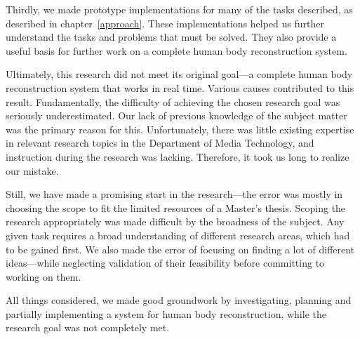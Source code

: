 Thirdly, we made prototype implementations for many of the tasks described, as described in chapter~\ref{approach}. These implementations helped us further understand the tasks and problems that must be solved. They also provide a useful basis for further work on a complete human body reconstruction system.

\newtopic

Ultimately, this research did not meet its original goal---a complete human body reconstruction system that works in real time. Various causes contributed to this result. Fundamentally, the difficulty of achieving the chosen research goal was seriously underestimated. Our lack of previous knowledge of the subject matter was the primary reason for this. Unfortunately, there was little existing expertise in relevant research topics in the Department of Media Technology, and instruction during the research was lacking. Therefore, it took us long to realize our mistake.

Still, we have made a promising start in the research---the error was mostly in choosing the scope to fit the limited resources of a Master's thesis. Scoping the research appropriately was made difficult by the broadness of the subject. Any given task requires a broad understanding of different research areas, which had to be gained first. We also made the error of focusing on finding a lot of different ideas---while neglecting validation of their feasibility before committing to working on them.

All things considered, we made good groundwork by investigating, planning and partially implementing a system for human body reconstruction, while the research goal was not completely met.
